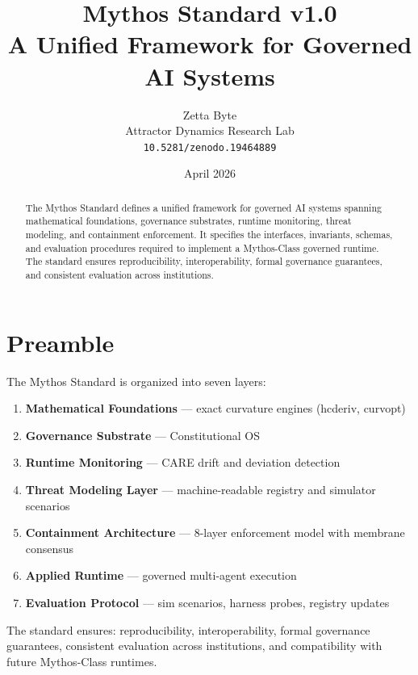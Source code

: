 \documentclass[11pt]{article}
\title{\textbf{Mythos Standard v1.0}\\
\large A Unified Framework for Governed AI Systems}
\author{Zetta Byte\\
Attractor Dynamics Research Lab\\
\texttt{10.5281/zenodo.19464889}}
\date{April 2026}
\begin{document}
\maketitle
\thispagestyle{fancy}

\begin{abstract}
The Mythos Standard defines a unified framework for governed AI systems spanning mathematical
foundations, governance substrates, runtime monitoring, threat modeling, and containment
enforcement. It specifies the interfaces, invariants, schemas, and evaluation procedures required
to implement a Mythos-Class governed runtime. The standard ensures reproducibility,
interoperability, formal governance guarantees, and consistent evaluation across institutions.
\end{abstract}

\tableofcontents
\newpage


\section{Preamble}

The Mythos Standard is organized into seven layers:

\begin{enumerate}[noitemsep]
\item \textbf{Mathematical Foundations} --- exact curvature engines (hcderiv, curvopt)
\item \textbf{Governance Substrate} --- Constitutional OS
\item \textbf{Runtime Monitoring} --- CARE drift and deviation detection
\item \textbf{Threat Modeling Layer} --- machine-readable registry and simulator scenarios
\item \textbf{Containment Architecture} --- 8-layer enforcement model with membrane consensus
\item \textbf{Applied Runtime} --- governed multi-agent execution
\item \textbf{Evaluation Protocol} --- sim scenarios, harness probes, registry updates
\end{enumerate}

The standard ensures: reproducibility, interoperability, formal governance guarantees,
consistent evaluation across institutions, and compatibility with future Mythos-Class runtimes.

\end{document}
